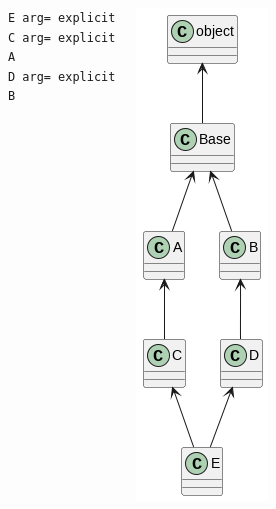 \begin{frame}[fragile]
\begin{columns}[T]
\begin{cmdbox}[Output]
\begin{verbatim}
E arg= explicit
C arg= explicit
A
D arg= explicit
B
\end{verbatim}
\end{cmdbox}
%
\begin{center}
\includegraphics[width=.7\linewidth]{./gfx/13-class-inheritance}
\end{center}
\end{columns}
%
\end{frame}

